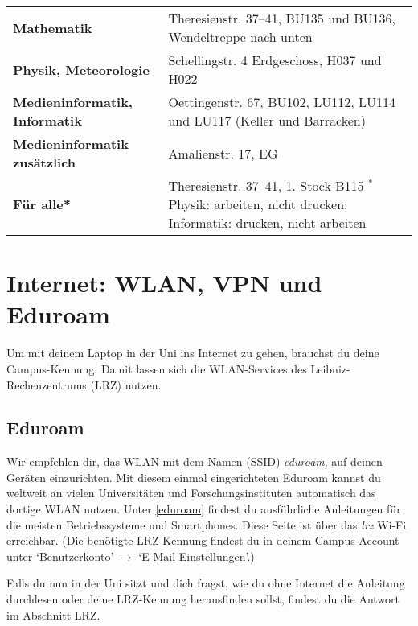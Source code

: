 \begin{tabularx}{\linewidth}{lX}
\textbf{Mathematik}                   & Theresienstr. 37--41, BU135 und BU136, Wendeltreppe nach unten\\
\textbf{Physik, Meteorologie}         & Schellingstr. 4 Erdgeschoss, H037 und H022\\
\textbf{Medieninformatik, Informatik} & Oettingenstr. 67, BU102, LU112, LU114 und LU117 (Keller und Barracken)\\
\textbf{Medieninformatik zusätzlich}  & Amalienstr. 17, EG\\
\textbf{Für alle*}                    & Theresienstr. 37--41, 1. Stock B115 \newline
\footnotesize{$^*$Physik: arbeiten, nicht drucken; \newline $\phantom{^*}$Informatik: drucken, nicht arbeiten}
\end{tabularx}


\section{Internet: WLAN, VPN und Eduroam}

Um mit deinem Laptop in der Uni ins Internet zu gehen, brauchst du
deine Campus-Kennung. Damit lassen sich die WLAN-Services des
Leibniz-Rechen\-zentrums (LRZ) nutzen.

\subsection*{Eduroam}
Wir empfehlen dir, das WLAN mit dem Namen (SSID) \emph{eduroam}, auf deinen Geräten einzurichten. Mit diesem einmal eingerichteten Eduroam kannst du weltweit an vielen Universitäten und Forschungsinstituten automatisch das dortige WLAN nutzen. Unter \ref{eduroam} findest du ausführliche Anleitungen für die meisten Betriebssysteme und Smartphones.
Diese Seite ist über das \emph{lrz} Wi-Fi erreichbar.
(Die benötigte LRZ-Kennung findest du in deinem Campus-Account unter `Benutzerkonto' $\rightarrow$ `E-Mail-Einstellungen'.)


Falls du nun in der Uni sitzt und dich fragst, wie du ohne Internet
die Anleitung durchlesen oder deine LRZ-Kennung herausfinden sollst, 
findest du die Antwort im Abschnitt LRZ.

\begin{urlList}
\end{urlList}

